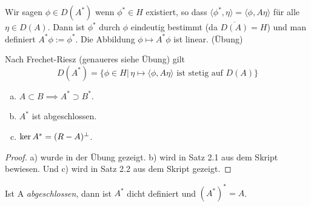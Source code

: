 \documentclass{mycourse}
\begin{document}
Wir sagen $\phi \in D(A^*)$ wenn $\phi^*\in H$ existiert, so dass $\langle \phi^*, \eta\rangle = \langle \phi, A\eta\rangle$ für alle $\eta \in D(A)$. Dann ist $\phi^*$ durch $\phi$ eindeutig bestimmt (da $\overline{D(A)}=H$) und man definiert $A^* \phi:= \phi^*$. Die Abbildung $\phi \mapsto A^*\phi$ ist linear. (Übung)

Nach Frechet-Riesz (genaueres siehe Übung) gilt
\[
D(A^*)=\{\phi\in H|\, \eta \mapsto \langle \phi, A\eta\rangle \text{ ist stetig auf } D(A)\}
\]

\begin{st}\label{2.1}
\begin{enumerate}[a)]
\item $A\subset B \implies A^*\supset B^*$.
\item $A^*$ ist abgeschlossen.
\item $\ker A^*=(R-A)^\perp$. 
\end{enumerate}
\end{st}
\begin{proof}
a) wurde in der Übung gezeigt. b) wird in Satz 2.1 aus dem Skript bewiesen. Und c) wird in Satz 2.2 aus dem Skript gezeigt.
\end{proof}
\begin{st}\label{2.2}
Ist A \emph{abgeschlossen}, dann ist $A^*$ dicht definiert und $(A^*)^*=A$.
\end{st}
\end{document}
